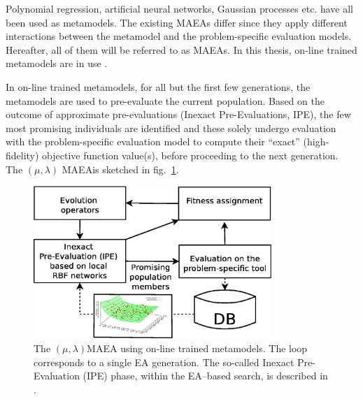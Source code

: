 Polynomial regression, artificial neural networks, Gaussian processes etc. have all been used as metamodels. The existing MAEAs differ since they apply different interactions between the metamodel and the problem-specific evaluation models. Hereafter, all of them will be referred to as MAEAs. In this thesis, on-line trained metamodels are in use \cite{LTT_2_018,LTT_2_020,LTT_2_029}. 
 
In on-line trained metamodels, for all but the first few generations, the metamodels are used to pre-evaluate the current population. Based on the outcome of approximate pre-evaluations (Inexact Pre-Evaluations, IPE), the few most promising individuals are identified and these solely undergo evaluation with the problem-specific evaluation model to compute their ``exact'' (high-fidelity) objective function value(s), before proceeding to the next generation. The $(\mu,\lambda)$ MAEAis sketched in fig.~\ref{MAEA}.


\begin{figure}[h!]
\centering
\includegraphics[width=90mm]{MAEA.eps} 
\caption{The $(\mu,\lambda)$MAEA using on-line trained metamodels. The loop corresponds to a single EA generation. The so-called Inexact Pre-Evaluation (IPE) phase, within the EA--based search, is described in \cite{LTT_2_018,LTT_2_020,LTT_2_029}. }
\label{MAEA}
\end{figure}


